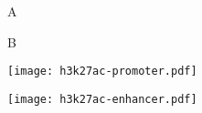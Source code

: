 \documentclass[a4paper,10pt]{article}
\begin{document}
\begin{figure}[!t]
\begin{subfigure}[t]{0.49\textwidth}
\Huge A
\end{subfigure}
\begin{subfigure}[t]{0.49\textwidth}
\Huge B
\end{subfigure}
\begin{subfigure}[t]{0.49\textwidth}
\texttt{[image: h3k27ac-promoter.pdf]} 
\end{subfigure}
\begin{subfigure}[b]{0.49\textwidth}
\texttt{[image: h3k27ac-enhancer.pdf]} 
\end{subfigure}
\end{figure}
\end{document}
